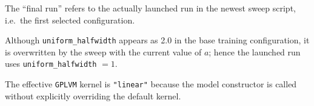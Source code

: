 \begin{table}[htbp]
\begin{threeparttable}
\begin{tabularx}{\textwidth}{
    >{\raggedright\arraybackslash}p{}
    >{\raggedright\arraybackslash}p{}
    >{\raggedright\arraybackslash}X
}
\bottomrule
\end{tabularx}

\begin{tablenotes}[flushleft]
\footnotesize
\item The ``final run'' refers to the actually launched run in the newest sweep script, i.e.\ the first selected configuration.
\item Although \texttt{uniform\_halfwidth} appears as 2.0 in the base training configuration, it is overwritten by the sweep with the current value of \(a\); hence the launched run uses \texttt{uniform\_halfwidth} \(=1\).
\item The effective \texttt{GPLVM} kernel is \texttt{"linear"} because the model constructor is called without explicitly overriding the default kernel.
\end{tablenotes}
\end{threeparttable}
\end{table}
